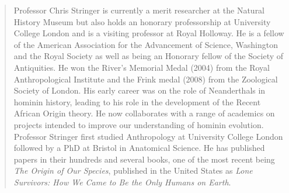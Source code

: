 \documentclass{ijsra}
\begin{document}
\begin{quote}
Professor Chris Stringer is currently a merit researcher at the Natural History Museum but also holds
an honorary professorship at University College London and is a visiting professor at Royal Holloway.
He is a fellow of the American Association for the Advancement of Science, Washington and the Royal Society as well as
being an Honorary fellow of the Society of Antiquities. 
He won the River’s Memorial Medal (2004) from the Royal Anthropological Institute and the Frink medal (2008) from
the Zoological Society of London. His early career was on the role of Neanderthals in hominin history,
leading to his role in the development of the Recent African Origin theory.
He now collaborates with a range of academics on projects intended to improve our understanding of hominin evolution.
Professor Stringer first studied Anthropology at University College London followed by a PhD at Bristol in Anatomical Science.
He has published papers in their hundreds and several books, one of the most recent being \emph{The Origin of Our Species},
published in the United States as \emph{Lone Survivors: How We Came to Be the Only Humans on Earth}.
\end{quote}

\IJSRAclosing
\end{document}
